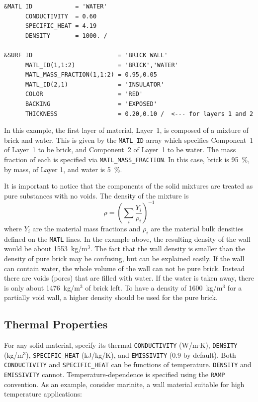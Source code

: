\documentclass[11pt]{book}
\newcommand{\ct}{\tt\small}
\newcommand{\be}{\begin{equation}}
\newcommand{\ee}{\end{equation}}
\begin{document}
\footnotesize
\begin{verbatim}
&MATL ID            = 'WATER'
      CONDUCTIVITY  = 0.60
      SPECIFIC_HEAT = 4.19
      DENSITY       = 1000. /

&SURF ID                        = 'BRICK WALL'
      MATL_ID(1,1:2)            = 'BRICK','WATER'
      MATL_MASS_FRACTION(1,1:2) = 0.95,0.05
      MATL_ID(2,1)              = 'INSULATOR'
      COLOR                     = 'RED'
      BACKING                   = 'EXPOSED'
      THICKNESS                 = 0.20,0.10 /  <--- for layers 1 and 2

\end{verbatim}
\normalsize
\noindent
In this example, the first layer of material, Layer~1, is composed of a mixture of
brick and water. This is given by the {\ct MATL\_ID} array which specifies
Component~1 of Layer~1 to be brick, and Component~2 of
Layer~1 to be water. The mass fraction of each is specified via {\ct MATL\_MASS\_FRACTION}. In this
case, brick is 95~\%, by mass, of Layer 1, and water is 5~\%.

It is important to notice that the components of the solid mixtures
are treated as pure substances with no voids. The density of the
mixture is
\be
\rho = \left(\sum_i\frac{Y_i}{\rho_i}\right)^{-1}
\ee
where $Y_i$ are the material mass fractions and $\rho_i$ are the
material bulk densities defined on the {\ct MATL} lines. In the
example above, the resulting density of the wall would be about
1553~kg/m$^3$. The fact that the wall density is smaller than the
density of pure brick may be confusing, but can be explained easily.
If the wall can contain water, the whole volume of the wall can not be
pure brick. Instead there are voids (pores) that are
filled with water. If the water is taken away, there is only about
1476~kg/m$^3$ of brick left. To have a density of 1600~kg/m$^3$ for a
partially void wall, a higher density should be used for the pure
brick.

\subsection{Thermal Properties}

\label{info:thermal_properties}

For any solid material, specify its thermal
{\ct CONDUCTIVITY} (W/m$\cdot$K), {\ct DENSITY} (kg/m$^3$),
{\ct SPECIFIC\_HEAT} (kJ/kg/K), and {\ct EMISSIVITY} (0.9 by default).
Both {\ct CONDUCTIVITY} and {\ct SPECIFIC\_HEAT} can be functions of
temperature. {\ct DENSITY} and {\ct EMISSIVITY} cannot.
Temperature-dependence is specified using the {\ct RAMP} convention.
As an example, consider marinite, a wall material suitable for high temperature applications:
\end{document}
